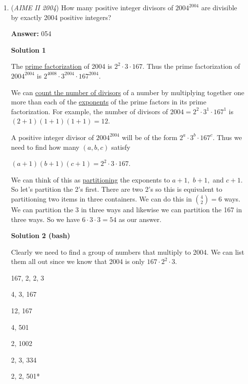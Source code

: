 \begin{enumerate}
	\item (\textit{AIME II 2004}) How many positive integer divisors of $2004^{2004}$ are divisible by exactly 2004 positive integers?


 
 \textbf{Answer: }054



\textbf{Solution 1}

The \href{https://artofproblemsolving.com/wiki/index.php?title=Prime\_factorization}{prime factorization} of 2004 is $2^2\cdot 3\cdot 167$.  Thus the prime factorization of $2004^{2004}$ is $2^{4008}\cdot 3^{2004}\cdot 167^{2004}$.

 We can \href{https://artofproblemsolving.com/wiki/index.php?title=Divisor\_function}{ count the number of divisors} of a number by multiplying together one more than each of the \href{https://artofproblemsolving.com/wiki/index.php?title=Exponentiation}{ exponents} of the prime factors in its prime factorization.  For example, the number of divisors of $2004=2^2\cdot 3^1\cdot 167^1$ is $(2+1)(1+1)(1+1)=12$.  

 A positive integer divisor of $2004^{2004}$ will be of the form $2^a\cdot 3^b\cdot 167^c$.  Thus we need to find how many $(a,b,c)$ satisfy 

 $(a+1)(b+1)(c+1)=2^2\cdot 3\cdot 167.$

 We can think of this as \href{https://artofproblemsolving.com/wiki/index.php?title=Partition}{partitioning} the exponents to $a+1,$ $b+1,$ and  $c+1$.  So let's partition the 2's first.  There are two 2's so this is equivalent to partitioning two items in three containers.  We can do this in ${4 \choose 2} = 6$ ways.  We can partition the 3 in three ways and likewise we can partition the 167 in three ways.  So we have $6\cdot 3\cdot 3 = \boxed{54}$ as our answer.

 



\textbf{Solution 2 (bash)}

Clearly we need to find a group of numbers that multiply to 2004. We can list them all out since we know that 2004 is only $167 \cdot 2^2 \cdot 3$.

 167, 2, 2, 3

 4, 3, 167

 12, 167

 4, 501

 2, 1002

 2, 3, 334

 2, 2, 501*


\end{enumerate}
